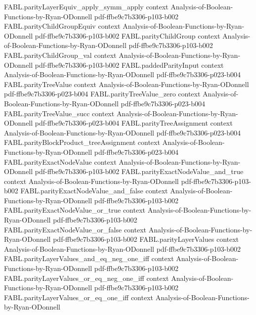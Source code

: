 \begin{theorem}
\proofstep
  {FABL.parityLayerEquiv_apply_symm_apply}
  {context}
  {Analysis-of-Boolean-Functions-by-Ryan-ODonnell}
  {pdf-ffbe9c7b3306-p103-b002}
\proofstep
  {FABL.parityChildGroupEquiv}
  {context}
  {Analysis-of-Boolean-Functions-by-Ryan-ODonnell}
  {pdf-ffbe9c7b3306-p103-b002}
\proofstep
  {FABL.parityChildGroup}
  {context}
  {Analysis-of-Boolean-Functions-by-Ryan-ODonnell}
  {pdf-ffbe9c7b3306-p103-b002}
\proofstep
  {FABL.parityChildGroup_val}
  {context}
  {Analysis-of-Boolean-Functions-by-Ryan-ODonnell}
  {pdf-ffbe9c7b3306-p103-b002}
\proofstep
  {FABL.paddedParityInput}
  {context}
  {Analysis-of-Boolean-Functions-by-Ryan-ODonnell}
  {pdf-ffbe9c7b3306-p023-b004}
\proofstep
  {FABL.parityTreeValue}
  {context}
  {Analysis-of-Boolean-Functions-by-Ryan-ODonnell}
  {pdf-ffbe9c7b3306-p023-b004}
\proofstep
  {FABL.parityTreeValue_zero}
  {context}
  {Analysis-of-Boolean-Functions-by-Ryan-ODonnell}
  {pdf-ffbe9c7b3306-p023-b004}
\proofstep
  {FABL.parityTreeValue_succ}
  {context}
  {Analysis-of-Boolean-Functions-by-Ryan-ODonnell}
  {pdf-ffbe9c7b3306-p023-b004}
\proofstep
  {FABL.parityTreeAssignment}
  {context}
  {Analysis-of-Boolean-Functions-by-Ryan-ODonnell}
  {pdf-ffbe9c7b3306-p023-b004}
\proofstep
  {FABL.parityBlockProduct_treeAssignment}
  {context}
  {Analysis-of-Boolean-Functions-by-Ryan-ODonnell}
  {pdf-ffbe9c7b3306-p023-b004}
\proofstep
  {FABL.parityExactNodeValue}
  {context}
  {Analysis-of-Boolean-Functions-by-Ryan-ODonnell}
  {pdf-ffbe9c7b3306-p103-b002}
\proofstep
  {FABL.parityExactNodeValue_and_true}
  {context}
  {Analysis-of-Boolean-Functions-by-Ryan-ODonnell}
  {pdf-ffbe9c7b3306-p103-b002}
\proofstep
  {FABL.parityExactNodeValue_and_false}
  {context}
  {Analysis-of-Boolean-Functions-by-Ryan-ODonnell}
  {pdf-ffbe9c7b3306-p103-b002}
\proofstep
  {FABL.parityExactNodeValue_or_true}
  {context}
  {Analysis-of-Boolean-Functions-by-Ryan-ODonnell}
  {pdf-ffbe9c7b3306-p103-b002}
\proofstep
  {FABL.parityExactNodeValue_or_false}
  {context}
  {Analysis-of-Boolean-Functions-by-Ryan-ODonnell}
  {pdf-ffbe9c7b3306-p103-b002}
\proofstep
  {FABL.parityLayerValues}
  {context}
  {Analysis-of-Boolean-Functions-by-Ryan-ODonnell}
  {pdf-ffbe9c7b3306-p103-b002}
\proofstep
  {FABL.parityLayerValues_and_eq_neg_one_iff}
  {context}
  {Analysis-of-Boolean-Functions-by-Ryan-ODonnell}
  {pdf-ffbe9c7b3306-p103-b002}
\proofstep
  {FABL.parityLayerValues_or_eq_neg_one_iff}
  {context}
  {Analysis-of-Boolean-Functions-by-Ryan-ODonnell}
  {pdf-ffbe9c7b3306-p103-b002}
\proofstep
  {FABL.parityLayerValues_or_eq_one_iff}
  {context}
  {Analysis-of-Boolean-Functions-by-Ryan-ODonnell}

\end{theorem}
